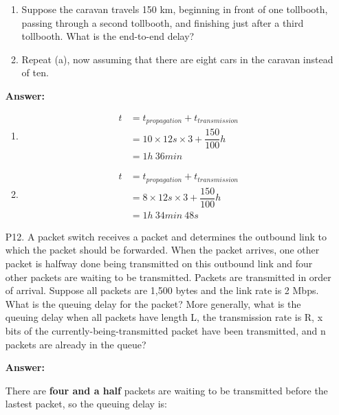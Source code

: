 \begin{enumerate}
	\begin{enumerate}
    	\item Suppose the caravan travels 150 km, beginning in front of one tollbooth, passing through a second tollbooth, and finishing just after a third tollbooth. What is the end-to-end delay?
    	
    	\item Repeat (a), now assuming that there are eight cars in the caravan instead	of ten.	    
	\end{enumerate}
	
	\textbf{Answer:}
	\begin{enumerate}
		\item 
		\begin{equation*}
			\begin{split}
				t & = t_{propagation} + t_{transmission} \\ & = 10 \times 12 s \times 3 + \dfrac{150}{100} h \\ & = 1 h \ 36 min
			\end{split}
		\end{equation*}
		
		\item 
		\begin{equation*}
			\begin{split}
				t & = t_{propagation} + t_{transmission} \\ & = 8 \times 12 s \times 3 + \dfrac{150}{100} h \\ & = 1 h\ 34 min\ 48 s
			\end{split}
		\end{equation*}
	\end{enumerate}
	
	\item[P12.] A packet switch receives a packet and determines the outbound link to which the packet should be forwarded. When the packet arrives, one other packet is halfway done being transmitted on this outbound link and four other packets are waiting to be transmitted. Packets are transmitted in order of arrival. Suppose all packets are 1,500 bytes and the link rate is 2 Mbps. What is the queuing delay for the packet? More generally, what is the queuing delay when all packets have length L, the transmission rate is R, x bits of the currently-being-transmitted packet have been transmitted, and n packets are already in the queue?
	
	\textbf{Answer:}
	
	There are \textbf{four and a half} packets are waiting to be transmitted before the lastest packet, so the queuing delay is:
	

\end{enumerate}
